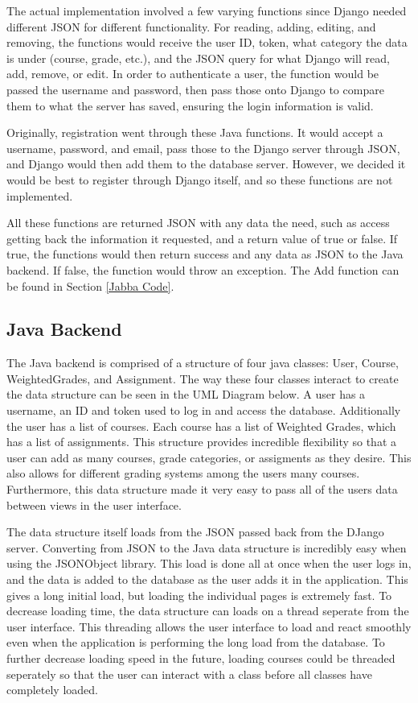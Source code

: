 \documentclass[a4paper]{article} %
\begin{document}
The actual implementation involved a few varying functions since Django needed different JSON for different functionality. For reading, adding, editing, and removing, the functions would receive the user ID, token, what category the data is under (course, grade, etc.), and the JSON query for what Django will read, add, remove, or edit. In order to authenticate a user, the function would be passed the username and password, then pass those onto Django to compare them to what the server has saved, ensuring the login information is valid.

Originally, registration went through these Java functions. It would accept a username, password, and email, pass those to the Django server through JSON, and Django would then add them to the database server. However, we decided it would be best to register through Django itself, and so these functions are not implemented.

All these functions are returned JSON with any data the need, such as access getting back the information it requested, and a return value of true or false. If true, the functions would then return success and any data as JSON to the Java backend. If false, the function would throw an exception. The Add function can be found in Section \ref{Jabba Code}.
\subsection{Java Backend}
The Java backend is comprised of a structure of four java classes: User, Course, WeightedGrades, and Assignment. The way these four classes interact to create the data structure can be seen in the UML Diagram below. A user has a username, an ID and token used to log in and access the database. Additionally the user has a list of courses. Each course has a list of Weighted Grades, which has a list of assignments. This structure provides incredible flexibility so that a user can add  as many courses, grade categories, or assigments as they desire. This also allows for different grading systems among the users many courses. Furthermore, this data structure made it very easy to pass all of the users data between views in the user interface.

The data structure itself loads from the JSON passed back from the DJango server.  Converting from JSON to the Java data structure is incredibly easy when using the JSONObject library. This load is done all at once when the user logs in, and the data is added to the database as the user adds it in the application. This gives a long initial load, but loading the individual pages is extremely fast. To decrease loading time, the data structure can loads on a thread seperate from the user interface. This threading allows the user interface to load and react smoothly even when the application is performing the long load from the database. To further decrease loading speed in the future, loading courses could be threaded seperately so that the user can interact with a class before all classes have completely loaded.
\end{document}
